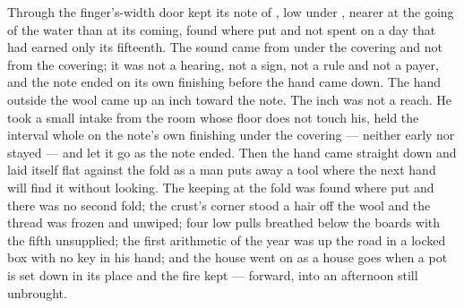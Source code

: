 Through the finger's-width door  kept its note of , low under , nearer at the going of the water than at its coming, found where put and not spent on a day that had earned only its fifteenth. The sound came from under the covering and not from the covering; it was not a hearing, not a sign, not a rule and not a payer, and the note ended on its own finishing before the hand came down. The hand outside the wool came up an inch toward the note. The inch was not a reach. He took a small intake from the room whose floor does not touch his, held the interval whole on the note's own finishing under the covering --- neither early nor stayed --- and let it go as the note ended. Then the hand came straight down and laid itself flat against the fold as a man puts away a tool where the next hand will find it without looking. The keeping at the fold was found where put and there was no second fold; the crust's corner stood a hair off the wool and the thread was frozen and unwiped; four low pulls breathed below the boards with the fifth unsupplied; the first arithmetic of the year was up the road in a locked box with no key in his hand; and the house went on as a house goes when a pot is set down in its place and the fire kept --- forward, into an afternoon still unbrought.
